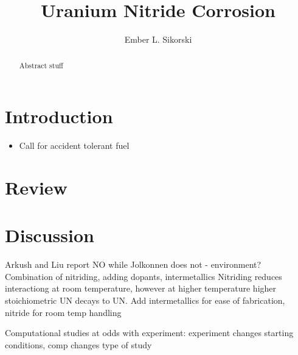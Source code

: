 \documentclass[3p,review,11pt]{elsarticle}
\begin{document}
\begin{frontmatter}
	\title{Uranium Nitride Corrosion}
	
	\author[boise]{Ember L. Sikorski}
	
	
	\address[boise]{Boise State University}
	
	\begin{abstract}
Abstract stuff
	\end{abstract}	
	
\end{frontmatter}


\section{Introduction}

\begin{itemize}
	\item Call for accident tolerant fuel
\end{itemize}

\section{Review}

\cite{Jolkkonen2017}

\cite{Johnson2016}

\cite{Lopes2017}

\cite{Lu2016}



\section{Discussion}
Arkush and Liu report NO while Jolkonnen does not - environment?
Combination of nitriding, adding dopants, intermetallics
Nitriding reduces interactiong at room temperature, however at higher temperature higher stoichiometric UN decays to UN.
Add intermetallics for ease of fabrication, nitride for room temp handling
\par 
Computational studies at odds with experiment: experiment changes starting conditions, comp changes type of study
\end{document}
